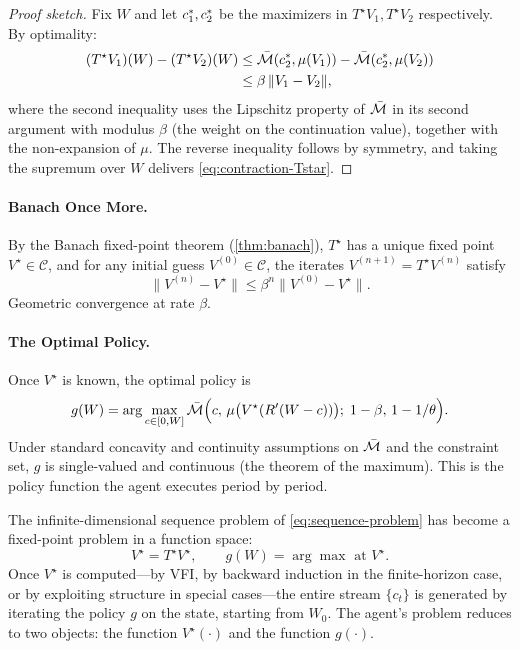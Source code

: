 \begin{proof}[Proof sketch]
Fix $W$ and let $c_1^{*}, c_2^{*}$ be the maximizers in $T^\star V_1, T^\star V_2$ respectively. By optimality:
\begin{align}
(T^\star V_1)(W) - (T^\star V_2)(W) &\leq \bar{\mathcal{M}}(c_2^{*}, \mu(V_1)) - \bar{\mathcal{M}}(c_2^{*}, \mu(V_2)) \notag \\
&\leq \beta \, \|V_1 - V_2\|,
\end{align}
where the second inequality uses the Lipschitz property of $\bar{\mathcal{M}}$ in its second argument with modulus $\beta$ (the weight on the continuation value), together with the non-expansion of $\mu$. The reverse inequality follows by symmetry, and taking the supremum over $W$ delivers \cref{eq:contraction-Tstar}.
\end{proof}

\paragraph{Banach Once More.}
By the Banach fixed-point theorem (\cref{thm:banach}), $T^\star$ has a unique fixed point $V^\star \in \mathcal{C}$, and for any initial guess $V^{(0)} \in \mathcal{C}$, the iterates $V^{(n+1)} = T^\star V^{(n)}$ satisfy
\begin{equation}
\|V^{(n)} - V^\star\| \leq \beta^n \|V^{(0)} - V^\star\|.
\label{eq:bellman-convergence}
\end{equation}
Geometric convergence at rate $\beta$.

\paragraph{The Optimal Policy.}
Once $V^\star$ is known, the optimal policy is
\begin{equation}
g(W) = \arg\max_{c \in [0, W]} \bar{\mathcal{M}}\Big( c, \, \mu\big( V^\star(R'(W-c)) \big); \; 1-\beta, \, 1-1/\theta \Big).
\label{eq:optimal-policy}
\end{equation}
Under standard concavity and continuity assumptions on $\bar{\mathcal{M}}$ and the constraint set, $g$ is single-valued and continuous (the theorem of the maximum). This is the policy function the agent executes period by period.

\begin{calloutimportant}
The infinite-dimensional sequence problem of \cref{eq:sequence-problem} has become a fixed-point problem in a function space:
\[
V^\star = T^\star V^\star, \qquad g(W) = \arg\max \text{ at } V^\star.
\]
Once $V^\star$ is computed---by VFI, by backward induction in the finite-horizon case, or by exploiting structure in special cases---the entire stream $\{c_t\}$ is generated by iterating the policy $g$ on the state, starting from $W_0$. The agent's problem reduces to two objects: the function $V^\star(\cdot)$ and the function $g(\cdot)$.
\end{calloutimportant}

